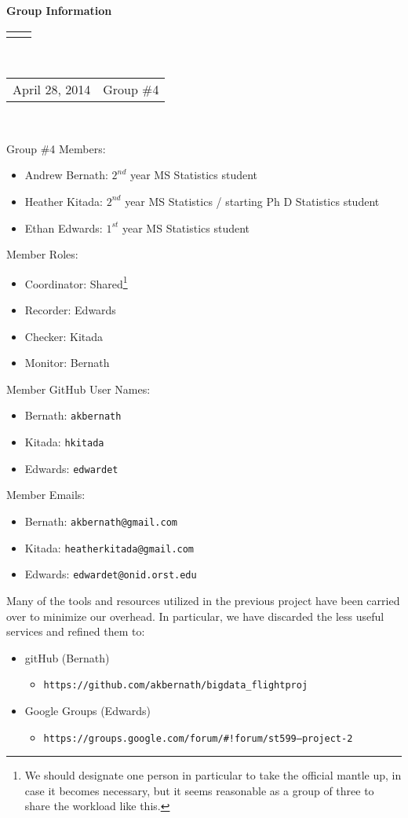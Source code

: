 \documentclass[12pt]{article}
\renewcommand{\title}[1]{\textbf{#1}\\}
\renewcommand{\line}{\begin{tabularx}{\textwidth}{X>{\raggedleft}X}\hline\\\end{tabularx}\\[-0.5cm]}
\newcommand{\leftright}[2]{\begin{tabularx}{\textwidth}{X>{\raggedleft}X}#1%
& #2\\\end{tabularx}\\[-0.5cm]}
\begin{document}
\title{Group Information}
\line
\leftright{April 28, 2014}{Group \#4} %
\vspace{5mm}

Group \#4 Members: 
\begin{itemize}
\item Andrew Bernath: $2^{nd}$ year MS Statistics student
\item Heather Kitada: $2^{nd}$ year MS Statistics / starting Ph D Statistics student
\item Ethan Edwards: $1^{st}$ year MS Statistics student
\end{itemize}

Member Roles: 
\begin{itemize}
\item Coordinator: Shared\footnote{We should designate one person in particular to take the official mantle up, in case it becomes necessary, but it seems reasonable as a group of three to share the workload like this.} 
\item Recorder: Edwards
\item Checker: Kitada
\item Monitor: Bernath
\end{itemize}

Member GitHub User Names:  
\begin{itemize}
\item Bernath: \texttt{akbernath}
\item Kitada: \texttt{hkitada}
\item Edwards: \texttt{edwardet}
\end{itemize}

Member Emails: 
\begin{itemize}
\item Bernath: \texttt{akbernath@gmail.com}
\item Kitada: \texttt{heatherkitada@gmail.com}
\item Edwards: \texttt{edwardet@onid.orst.edu}
\end{itemize}

\pagebreak

Many of the tools and resources utilized in the previous project have been carried over to minimize our overhead. In particular, we have discarded the less useful services and refined them to:
\begin{itemize}
\item gitHub (Bernath)
\begin{itemize}
\item[] \texttt{https://github.com/akbernath/bigdata\_flightproj}
\end{itemize}
\item Google Groups (Edwards)
\begin{itemize}
\item[] \texttt{https://groups.google.com/forum/\#!forum/st599---project-2}
\end{itemize}
\end{itemize}
\end{document}
